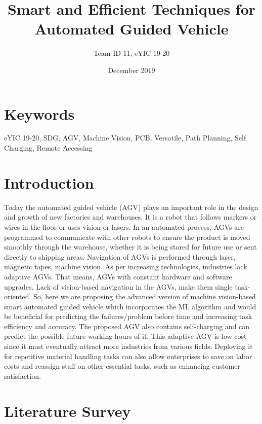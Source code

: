 \documentclass[12pt]{article}
\title{Smart and Efficient Techniques for Automated Guided Vehicle}
\author{Team ID 11, eYIC 19-20}
\date{December 2019}
\begin{document}
\maketitle

\section*{Keywords}
eYIC 19-20, SDG, AGV, Machine Vision, PCB, Versatile, Path Planning, Self  Charging, Remote Accessing

\section{Introduction}

Today the automated guided vehicle (AGV) plays an important role in the design and growth of new factories and warehouses. It is a robot that follows markers or wires in the floor or uses vision or lasers.  In an automated process, AGVs are programmed to communicate with other robots to ensure the product is moved smoothly through the warehouse, whether it is being stored for future use or sent directly to shipping areas. Navigation of AGVs is performed through laser, magnetic tapes, machine vision. As per increasing technologies, industries lack adaptive AGVs. That means, AGVs with constant hardware and software upgrades. Lack of vision-based navigation in the AGVs, make them single task-oriented. So, here we are proposing the advanced version of machine vision-based smart automated guided vehicle which incorporates the ML algorithm and would be beneficial for predicting the failures/problem before time and increasing task efficiency and accuracy. The proposed AGV also contains self-charging and can predict the possible future working hours of it. This adaptive AGV is low-cost since it must eventually attract more industries from various fields. Deploying it for repetitive material handling tasks can also allow enterprises to save on labor costs and reassign staff on other essential tasks, such as enhancing customer satisfaction.

\section{Literature Survey}
\end{document}
